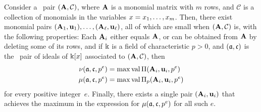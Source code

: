 \documentclass{article}
\begin{document}
\begin{theorem}
\label{reduce to diagonal general: T}
Consider a \compatible\ pair $(\mathbf{A}, \mathcal{C})$, where $\mathbf{A}$ is a monomial matrix with $m$ rows, and $\mathcal{C}$ is a collection of monomials in the variables $x = x_1, \ldots, x_m$.    Then, there exist monomial pairs $(\mathbf{A}_1, \mathbf{u}_1), \ldots, (\mathbf{A}_{\ell}, \mathbf{u}_{\ell})$, all of which are small when $(\mathbf{A}, \mathcal{C})$ is, with the following properties\textup:  Each $\mathbf{A}_i$ either equals $\mathbf{A}$, or can be obtained from $\mathbf{A}$ by deleting some of its rows, and if $\Bbbk$ is a field of characteristic $p>0$, and $(\mathfrak{a}, \mathfrak{c})$ is the \compatible\ pair of ideals of $\Bbbk[x]$ associated to $(\mathbf{A}, \mathcal{C})$, then 
\begin{align*}
\nu(\mathfrak{a}, \mathfrak{c}, p^e) & = \max  \operatorname{val} \Pi(\mathbf{A}_i, \mathbf{u}_i, p^e)  \\ 
\mu(\mathfrak{a}, \mathfrak{c}, p^e) & = \max  \operatorname{val} \Pi_p(\mathbf{A}_i, \mathbf{u}_i, p^e) 
\end{align*}
for every positive integer~$e$.  Finally, there exists a single pair $(\mathbf{A}_i, \mathbf{u}_i)$ that achieves the maximum in the expression for $\mu(\mathfrak{a}, \mathfrak{c}, p^e)$ for all such $e$.
\end{theorem}
\end{document}
